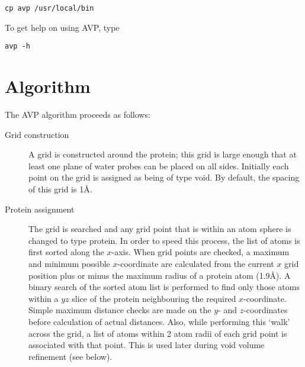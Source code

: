 \documentclass{article}
\begin{document}
\begin{verbatim}
cp avp /usr/local/bin
\end{verbatim}

To get help on using AVP, type

\begin{verbatim}
avp -h
\end{verbatim}



\section{Algorithm}

The AVP algorithm proceeds as follows:
\begin{description}

\item[Grid construction] A grid is constructed around the protein;
this grid is large enough that at least one plane of water probes can be
placed on all sides. Initially each point on the grid is assigned as
being of type void. By default, the spacing of this grid is 1\AA.

\item[Protein assignment] The grid is searched and any grid point that
is within an atom sphere is changed to type protein. In order to speed
this process, the list of atoms is first sorted along the
$x$-axis. When grid points are checked, a maximum and minimum possible
$x$-coordinate are calculated from the current $x$ grid position plus
or minus the maximum radius of a protein atom (1.9\AA). A binary
search of the sorted atom list is performed to find only those atoms
within a $yz$ slice of the protein neighbouring the required
$x$-coordinate. Simple maximum distance checks are made on the $y$-
and $z$-coordinates before calculation of actual distances.  Also,
while performing this `walk' across the grid, a list of atoms within 2
atom radii of each grid point is associated with that point. This is
used later during void volume refinement (see below).


\end{description}
\end{document}
